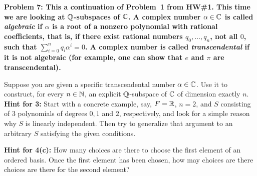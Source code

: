 \documentclass[11pt]{amsart}
\begin{document}
\skv
 \bf{Problem 7: }\rm This a continuation of Problem~1 from HW\#1. This time we are looking at ${\mathbb Q}$-subspaces of ${\mathbb C}$.
A complex number $\alpha\in{\mathbb C}$ is called {\it algebraic} if $\alpha$ is a root of a nonzero polynomial with rational coefficients,
that is, if there exist rational numbers  $q_0,\ldots, q_n$, not all $0$, such that $\sum\limits_{i=0}^n q_i \alpha^i=0$. 
A complex number is called {\it transcendental} if it is not algebraic (for example, one can show that $e$ and $\pi$ are transcendental).

Suppose you are given a specific transcendental number $\alpha\in{\mathbb C}$. Use it to construct, for every $n\in{\mathbb N}$, an explicit
${\mathbb Q}$-subspace of ${\mathbb C}$ of dimension exactly $n$.
\newpage
{\bf Hint for 3:} Start with a concrete example,
say, $F={\mathbb R}$, $n=2$, and $S$ consisting of $3$ polynomials of degrees $0,1$ and $2$, respectively, and look for a simple reason
why $S$ is linearly independent. Then try to generalize that argument to an arbitrary $S$ satisfying the given conditions.

\newpage
{\bf Hint for 4(c):} How many choices are there to choose the first element of an ordered basis. Once the first element has been chosen,
how may choices are there choices are there for the second element?
\end{document}
